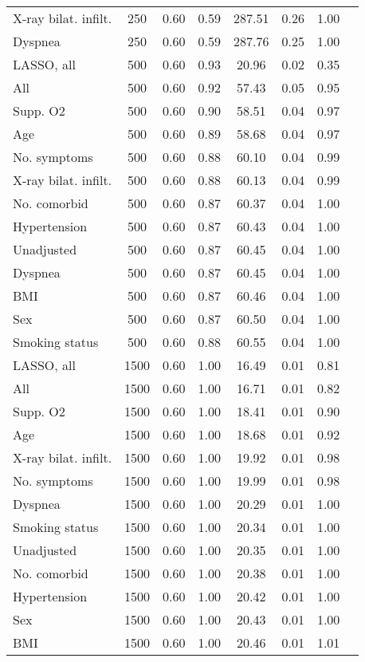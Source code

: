 \documentclass{article}
\begin{document}
{\begin{longtable}{lccccccc}
X-ray bilat. infilt. & 250 & 0.60 & 0.59 & 287.51 & 0.26 & 1.00 \\ 
Dyspnea & 250 & 0.60 & 0.59 & 287.76 & 0.25 & 1.00 \\ \midrule 
LASSO, all & 500 & 0.60 & 0.93 &  20.96 & 0.02 & 0.35 \\ 
All & 500 & 0.60 & 0.92 &  57.43 & 0.05 & 0.95 \\ 
Supp. O2 & 500 & 0.60 & 0.90 &  58.51 & 0.04 & 0.97 \\ 
Age & 500 & 0.60 & 0.89 &  58.68 & 0.04 & 0.97 \\ 
No. symptoms & 500 & 0.60 & 0.88 &  60.10 & 0.04 & 0.99 \\ 
X-ray bilat. infilt. & 500 & 0.60 & 0.88 &  60.13 & 0.04 & 0.99 \\ 
No. comorbid & 500 & 0.60 & 0.87 &  60.37 & 0.04 & 1.00 \\ 
Hypertension & 500 & 0.60 & 0.87 &  60.43 & 0.04 & 1.00 \\ 
Unadjusted & 500 & 0.60 & 0.87 &  60.45 & 0.04 & 1.00 \\ 
Dyspnea & 500 & 0.60 & 0.87 &  60.45 & 0.04 & 1.00 \\ 
BMI & 500 & 0.60 & 0.87 &  60.46 & 0.04 & 1.00 \\ 
Sex & 500 & 0.60 & 0.87 &  60.50 & 0.04 & 1.00 \\ 
Smoking status & 500 & 0.60 & 0.88 &  60.55 & 0.04 & 1.00 \\ \midrule 
LASSO, all & 1500 & 0.60 & 1.00 &  16.49 & 0.01 & 0.81 \\ 
All & 1500 & 0.60 & 1.00 &  16.71 & 0.01 & 0.82 \\ 
Supp. O2 & 1500 & 0.60 & 1.00 &  18.41 & 0.01 & 0.90 \\ 
Age & 1500 & 0.60 & 1.00 &  18.68 & 0.01 & 0.92 \\ 
X-ray bilat. infilt. & 1500 & 0.60 & 1.00 &  19.92 & 0.01 & 0.98 \\ 
No. symptoms & 1500 & 0.60 & 1.00 &  19.99 & 0.01 & 0.98 \\ 
Dyspnea & 1500 & 0.60 & 1.00 &  20.29 & 0.01 & 1.00 \\ 
Smoking status & 1500 & 0.60 & 1.00 &  20.34 & 0.01 & 1.00 \\ 
Unadjusted & 1500 & 0.60 & 1.00 &  20.35 & 0.01 & 1.00 \\ 
No. comorbid & 1500 & 0.60 & 1.00 &  20.38 & 0.01 & 1.00 \\ 
Hypertension & 1500 & 0.60 & 1.00 &  20.42 & 0.01 & 1.00 \\ 
Sex & 1500 & 0.60 & 1.00 &  20.43 & 0.01 & 1.00 \\ 
BMI & 1500 & 0.60 & 1.00 &  20.46 & 0.01 & 1.01 \\
\bottomrule
\hline
\end{longtable}
}
\end{document}
